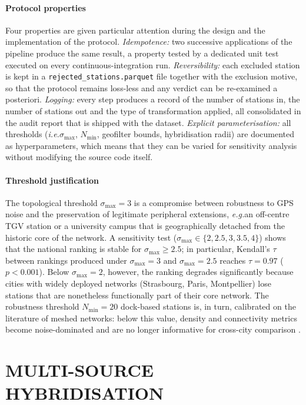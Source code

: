 \documentclass[a4paper,twoside]{article}
\newcommand{\ie}{\emph{i.e.}}
\newcommand{\eg}{\emph{e.g.}}
\begin{document}
\paragraph{Protocol properties}
Four properties are given particular attention during the design
and the implementation of the protocol. \emph{Idempotence:} two
successive applications of the pipeline produce the same result,
a property tested by a dedicated unit test executed on every
continuous-integration run. \emph{Reversibility:} each excluded
station is kept in a \texttt{rejected\_stations.parquet} file
together with the exclusion motive, so that the protocol remains
loss-less and any verdict can be re-examined a posteriori.
\emph{Logging:} every step produces a record of the number of
stations in, the number of stations out and the type of
transformation applied, all consolidated in the audit report that
is shipped with the dataset. \emph{Explicit parameterisation:}
all thresholds (\ie $\sigma_{\max}$, $N_{\min}$, geofilter
bounds, hybridisation radii) are documented as hyperparameters,
which means that they can be varied for sensitivity analysis
without modifying the source code itself.

\paragraph{Threshold justification}
The topological threshold $\sigma_{\max} = 3$ is a compromise
between robustness to GPS noise and the preservation of
legitimate peripheral extensions, \eg an off-centre TGV station
or a university campus that is geographically detached from the
historic core of the network. A sensitivity test
($\sigma_{\max} \in \{2,2.5,3,3.5,4\}$) shows that the national
ranking is stable for $\sigma_{\max} \ge 2.5$; in particular,
Kendall's $\tau$ between rankings produced under
$\sigma_{\max} = 3$ and $\sigma_{\max} = 2.5$ reaches
$\tau = 0.97$ ($p < 0.001$). Below $\sigma_{\max} = 2$, however,
the ranking degrades significantly because cities with widely
deployed networks (Strasbourg, Paris, Montpellier) lose stations
that are nonetheless functionally part of their core network. The
robustness threshold $N_{\min} = 20$ dock-based stations is, in
turn, calibrated on the literature of meshed networks: below this
value, density and connectivity metrics become noise-dominated
and are no longer informative for cross-city comparison
\cite{Saberi2018}.

\section{\uppercase{Multi-Source Hybridisation}}
\label{secHybridisation}
\end{document}
